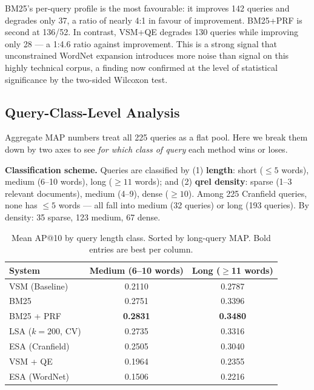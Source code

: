 \documentclass{svproc}
\begin{document}
    BM25's per-query profile is the most favourable: it improves 142 queries and degrades only 37, a ratio of nearly 4:1 in favour of improvement. BM25+PRF is second at 136/52. In contrast, VSM+QE degrades 130 queries while improving only 28 — a 1:4.6 ratio against improvement. This is a strong signal that unconstrained WordNet expansion introduces more noise than signal on this highly technical corpus, a finding now confirmed at the level of statistical significance by the two-sided Wilcoxon test.

    \subsection{Query-Class-Level Analysis}

    Aggregate MAP numbers treat all 225 queries as a flat pool. Here we break them down by two axes to see \emph{for which class of query} each method wins or loses.

    \textbf{Classification scheme.} Queries are classified by (1) \textbf{length}: short ($\le 5$ words), medium (6--10 words), long ($\ge 11$ words); and (2) \textbf{qrel density}: sparse (1--3 relevant documents), medium (4--9), dense ($\ge 10$). Among 225 Cranfield queries, none has $\le 5$ words — all fall into medium (32 queries) or long (193 queries). By density: 35 sparse, 123 medium, 67 dense.

    \begin{table}[H]
    \centering
    \renewcommand{\arraystretch}{1.2}
    \begin{tabular}{lcc}
    \toprule
    \textbf{System} & \textbf{Medium (6--10 words)} & \textbf{Long ($\ge$11 words)} \\
    \midrule
    VSM (Baseline)      & 0.2110 & 0.2787 \\
    BM25                & 0.2751 & 0.3396 \\
    BM25 + PRF          & \textbf{0.2831} & \textbf{0.3480} \\
    LSA ($k{=}200$, CV) & 0.2735 & 0.3316 \\
    ESA (Cranfield)     & 0.2505 & 0.3040 \\
    VSM + QE            & 0.1964 & 0.2355 \\
    ESA (WordNet)       & 0.1506 & 0.2216 \\
    \bottomrule
    \end{tabular}
    \caption{Mean AP@10 by query length class. Sorted by long-query MAP. Bold entries are best per column.}
    \label{tab:lengthclass}
    \end{table}
\end{document}

